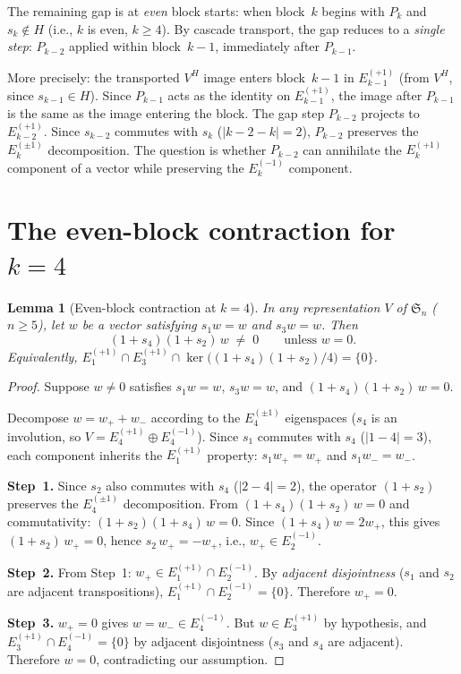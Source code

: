 \documentclass[11pt]{article}
\newtheorem{lemma}[theorem]{Lemma}
\theoremstyle{definition}
\theoremstyle{remark}
\newcommand{\Sym}{\mathfrak{S}}
\begin{document}
The remaining gap is at \emph{even} block starts: when block~$k$
begins with $P_k$ and $s_k \notin H$ (i.e., $k$ is even, $k \ge 4$).
By cascade transport, the gap reduces to a \emph{single step}:
$P_{k-2}$ applied within block~$k{-}1$, immediately after $P_{k-1}$.

More precisely: the transported $V^H$ image enters block~$k{-}1$ in
$E_{k-1}^{(+1)}$ (from $V^H$, since $s_{k-1} \in H$). Since
$P_{k-1}$ acts as the identity on $E_{k-1}^{(+1)}$, the image after
$P_{k-1}$ is the same as the image entering the block. The gap step
$P_{k-2}$ projects to $E_{k-2}^{(+1)}$. Since $s_{k-2}$ commutes with
$s_k$ ($|k{-}2 - k| = 2$), $P_{k-2}$ preserves the $E_k^{(\pm 1)}$
decomposition. The question is whether $P_{k-2}$ can annihilate the
$E_k^{(+1)}$ component of a vector while preserving the $E_k^{(-1)}$
component.


\section{The even-block contraction for $k = 4$}

\begin{lemma}[Even-block contraction at $k = 4$]\label{lem:k4}
In any representation $V$ of\/ $\Sym_n$ ($n \ge 5$), let $w$ be a
vector satisfying $s_1 w = w$ and $s_3 w = w$. Then
\[
  (1 + s_4)(1 + s_2)\, w \;\ne\; 0 \qquad\text{unless } w = 0.
\]
Equivalently, $E_1^{(+1)} \cap E_3^{(+1)} \cap
\ker\bigl((1{+}s_4)(1{+}s_2)/4\bigr) = \{0\}$.
\end{lemma}

\begin{proof}
Suppose $w \ne 0$ satisfies $s_1 w = w$, $s_3 w = w$, and
$(1 + s_4)(1 + s_2)\, w = 0$.

Decompose $w = w_+ + w_-$ according to the $E_4^{(\pm 1)}$
eigenspaces ($s_4$ is an involution, so $V = E_4^{(+1)} \oplus
E_4^{(-1)}$). Since $s_1$ commutes with $s_4$ ($|1 - 4| = 3$),
each component inherits the $E_1^{(+1)}$ property:
$s_1 w_+ = w_+$ and $s_1 w_- = w_-$.

\medskip\noindent\textbf{Step~1.}
Since $s_2$ also commutes with $s_4$ ($|2 - 4| = 2$), the operator
$(1 + s_2)$ preserves the $E_4^{(\pm 1)}$ decomposition.
From $(1 + s_4)(1 + s_2)\, w = 0$ and commutativity:
$(1 + s_2)(1 + s_4)\, w = 0$. Since $(1 + s_4)w = 2 w_+$,
this gives $(1 + s_2)\, w_+ = 0$, hence $s_2\, w_+ = -w_+$,
i.e., $w_+ \in E_2^{(-1)}$.

\medskip\noindent\textbf{Step~2.}
From Step~1: $w_+ \in E_1^{(+1)} \cap E_2^{(-1)}$.
By \emph{adjacent disjointness} ($s_1$ and $s_2$ are adjacent
transpositions), $E_1^{(+1)} \cap E_2^{(-1)} = \{0\}$.
Therefore $w_+ = 0$.

\medskip\noindent\textbf{Step~3.}
$w_+ = 0$ gives $w = w_- \in E_4^{(-1)}$.
But $w \in E_3^{(+1)}$ by hypothesis, and
$E_3^{(+1)} \cap E_4^{(-1)} = \{0\}$ by adjacent disjointness
($s_3$ and $s_4$ are adjacent).
Therefore $w = 0$, contradicting our assumption.
\end{proof}
\end{document}
